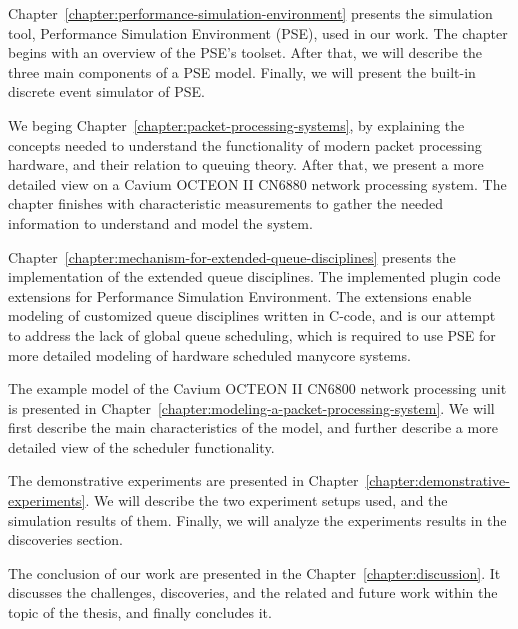 Chapter~\ref{chapter:performance-simulation-environment} presents the simulation tool, Performance Simulation Environment (PSE), used in our work. The chapter begins with an overview of the PSE's toolset. After that, we will describe the three main components of a PSE model. Finally, we will present the built-in discrete event simulator of PSE.

We beging Chapter~\ref{chapter:packet-processing-systems}, by explaining the concepts needed to understand the functionality of modern packet processing hardware, and their relation to queuing theory. After that, we present a more detailed view on a Cavium OCTEON II CN6880 network processing system. The chapter finishes with characteristic measurements to gather the needed information to understand and model the system.

Chapter~\ref{chapter:mechanism-for-extended-queue-disciplines} presents the implementation of the extended queue disciplines. The implemented plugin code extensions for Performance Simulation Environment. The extensions enable modeling of customized queue disciplines written in C-code, and is our attempt to address the lack of global queue scheduling, which is required to use PSE for more detailed modeling of  hardware scheduled manycore systems.

The example model of the Cavium OCTEON II CN6800 network processing unit is presented in Chapter~\ref{chapter:modeling-a-packet-processing-system}. We will first describe the main characteristics of the model, and further describe a more detailed view of the scheduler functionality.

The demonstrative experiments are presented in Chapter~\ref{chapter:demonstrative-experiments}. We will describe the two experiment setups used, and the simulation results of them. Finally, we will analyze the experiments results in the discoveries section.

The conclusion of our work are presented in the Chapter~\ref{chapter:discussion}. It discusses the challenges, discoveries, and the related and future work within the topic of the thesis, and finally concludes it.

